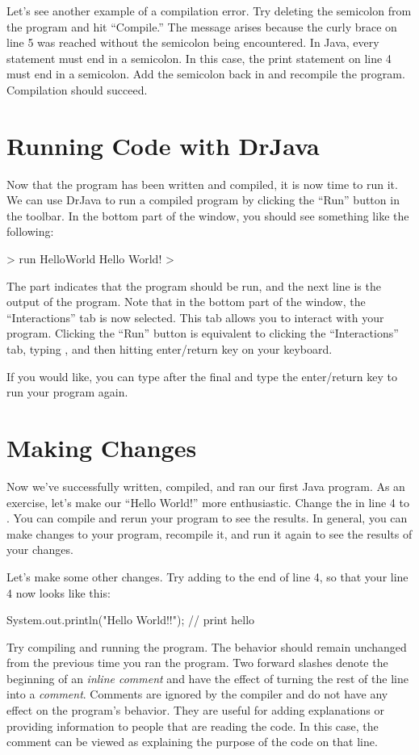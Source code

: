 Let's see another example of a compilation error. Try deleting the semicolon \ic{;} from the program and hit ``Compile.''
The message  arises because the curly brace on line 5 was reached without the semicolon being
encountered. In Java, every statement must end in a semicolon. In this case, the print statement on line 4 must
end in a semicolon. Add the semicolon back in and recompile the program. Compilation should succeed.

\section{Running Code with DrJava}
Now that the program has been written and compiled, it is now time to run it.
We can use DrJava to run a compiled program by clicking the ``Run'' button in the toolbar. In the bottom part of the window, you should see something like the following:
\begin{code}
> run HelloWorld
Hello World!
>
\end{code}
The  part indicates that the program  should be run, and the next line is the output of the program.
Note that in the bottom part of the window, the ``Interactions'' tab is now
selected. This tab allows you to interact with your program. Clicking
the ``Run'' button is equivalent to clicking the ``Interactions'' tab, typing
, and then hitting enter/return key on your keyboard.

If you would like, you can type  after the final \ic{>} and
type the enter/return key to run your program again.

\section{Making Changes}
Now we've successfully written, compiled, and ran our first Java program.
As an exercise, let's make our ``Hello World!'' more enthusiastic.
Change the  in line 4 to .
You can compile and rerun your program to see the results. In general,
you can make changes to your program, recompile it, and run it again
to see the results of your changes.

Let's make some other changes.
Try adding  to the end of line 4, so that your line 4 now looks like this:
\begin{code}
        System.out.println("Hello World!!"); // print hello
\end{code}
Try compiling and running the program. The behavior should remain unchanged from the previous time you ran the program.
Two forward slashes \ic{//} denote the beginning of an \emph{inline comment} and have the effect of
turning the rest of the line into a \emph{comment}. Comments are ignored by the compiler and do not have any effect on
the program's behavior. They are
useful for adding explanations or providing information to people that are reading the code. In this case,
the comment  can be viewed as explaining the purpose of the code on that line.

